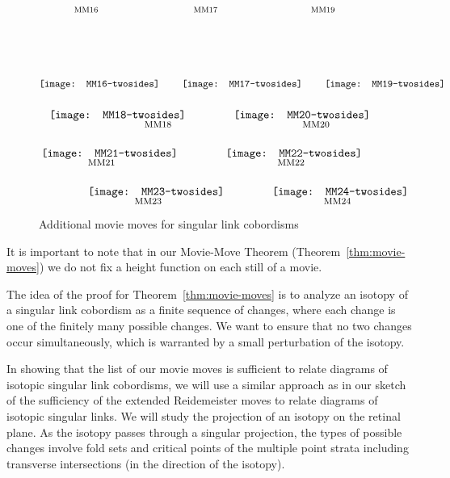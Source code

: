 \documentclass{amsart}\usepackage{amsfonts, amsmath, amssymb}\usepackage{graphicx, epic, epsf, enumerate, stmaryrd}
\theoremstyle{definition}
\numberwithin{equation}{section}
\begin{document}
\begin{figure}[ht]
\[\put(35, 60){\fontsize{8}{8}$\text{MM16}$}
\put(155, 60){\fontsize{8}{8}$\text{MM17}$}
\put(273, 60){\fontsize{8}{8}$\text{MM19}$}
\raisebox{-15pt}{\texttt{[image: MM16-twosides]}} \hspace{0.8cm} 
\raisebox{-15pt}{\texttt{[image: MM17-twosides]}} \hspace{0.8cm} 
\raisebox{-15pt}{\texttt{[image: MM19-twosides]}} \]

\[
\raisebox{-15pt}{\texttt{[image: MM18-twosides]}} \hspace{1.5cm}
\raisebox{-15pt}{\texttt{[image: MM20-twosides]}} 
\put(-200, -23){\fontsize{8}{8}$\text{MM18}$} 
\put(-60, -23){\fontsize{8}{8}$\text{MM20}$}
 \]

\[\hspace{-0.5cm}\raisebox{-15pt}{\texttt{[image: MM21-twosides]}} 
\hspace{1.5cm} \raisebox{-15pt}{\texttt{[image: MM22-twosides]}} 
\put(-243, -23){\fontsize{8}{8}$\text{MM21}$}
\put(-75, -23){\fontsize{8}{8}$\text{MM22}$}
\]

\[ \hspace{1.5cm} \raisebox{-15pt}{\texttt{[image: MM23-twosides]}} \hspace{1.5cm}
\raisebox{-15pt}{\texttt{[image: MM24-twosides]}}
\put(-243, -23){\fontsize{8}{8}$\text{MM23}$}
\put(-75, -23){\fontsize{8}{8}$\text{MM24}$}
\]
\caption{Additional movie moves for singular link cobordisms}\label{fig:new-reidclips}
\end{figure}

It is important to note that in our Movie-Move Theorem (Theorem~\ref{thm:movie-moves}) we do not fix a height function on each still of a movie.

The idea of the proof for Theorem~\ref{thm:movie-moves} is to analyze an isotopy of a singular link cobordism as a finite sequence of changes, where each change is one of the finitely many possible changes. We want to ensure that no two changes occur simultaneously, which is warranted by a small perturbation of the isotopy. 

In showing that the list of our movie moves is sufficient to relate diagrams of isotopic singular link cobordisms, we will use a similar approach as in our sketch of the sufficiency of the extended Reidemeister moves to relate diagrams of isotopic singular links. We will study the projection of an isotopy on the retinal plane. As the isotopy passes through a singular projection, the types of possible changes involve fold sets and critical points of the multiple point strata including transverse intersections (in the direction of the isotopy).
\end{document}
